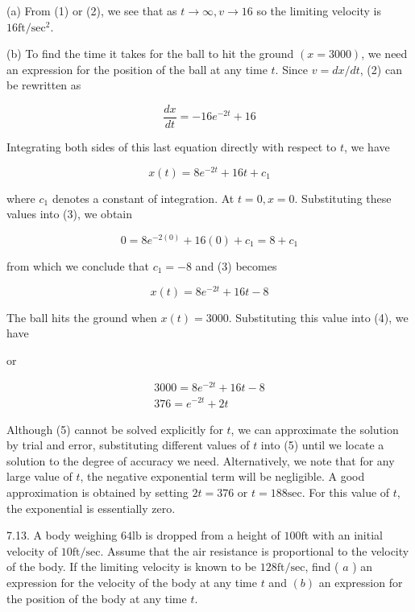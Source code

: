 \documentclass[10pt]{article}
\begin{document}
(a) From (1) or (2), we see that as $t \rightarrow \infty, v \rightarrow 16$ so the limiting velocity is $16 \mathrm{ft} / \mathrm{sec}^{2}$.

(b) To find the time it takes for the ball to hit the ground $(x=3000)$, we need an expression for the position of the ball at any time $t$. Since $v=d x / d t$, (2) can be rewritten as

$$
\frac{d x}{d t}=-16 e^{-2 t}+16
$$

Integrating both sides of this last equation directly with respect to $t$, we have


\begin{equation*}
x(t)=8 e^{-2 t}+16 t+c_{1} \tag{3}
\end{equation*}


where $c_{1}$ denotes a constant of integration. At $t=0, x=0$. Substituting these values into (3), we obtain

$$
0=8 e^{-2(0)}+16(0)+c_{1}=8+c_{1}
$$

from which we conclude that $c_{1}=-8$ and (3) becomes


\begin{equation*}
x(t)=8 e^{-2 t}+16 t-8 \tag{4}
\end{equation*}


The ball hits the ground when $x(t)=3000$. Substituting this value into (4), we have

or


\begin{gather*}
3000=8 e^{-2 t}+16 t-8 \\
376=e^{-2 t}+2 t \tag{5}
\end{gather*}


Although (5) cannot be solved explicitly for $t$, we can approximate the solution by trial and error, substituting different values of $t$ into (5) until we locate a solution to the degree of accuracy we need. Alternatively, we note that for any large value of $t$, the negative exponential term will be negligible. A good approximation is obtained by setting $2 t=376$ or $t=188 \mathrm{sec}$. For this value of $t$, the exponential is essentially zero.

7.13. A body weighing $64 \mathrm{lb}$ is dropped from a height of $100 \mathrm{ft}$ with an initial velocity of $10 \mathrm{ft} / \mathrm{sec}$. Assume that the air resistance is proportional to the velocity of the body. If the limiting velocity is known to be $128 \mathrm{ft} / \mathrm{sec}$, find ( $a$ ) an expression for the velocity of the body at any time $t$ and $(b)$ an expression for the position of the body at any time $t$.
\end{document}
